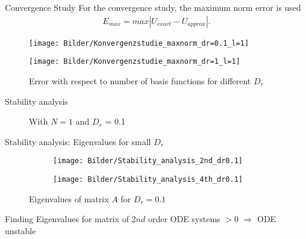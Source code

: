 \begin{frame}{Convergence Study}
	For the convergence study, the maximum norm error is used
	\begin{align*}
		E_{max} = max|U_{exact} - U_{approx}|.
	\end{align*}
	
	\begin{figure}
		\begin{minipage}{0.45\textwidth}
			\texttt{[image: Bilder/Konvergenzstudie\_maxnorm\_dr=0.1\_l=1]}
		\end{minipage}
		\hfill 
		\begin{minipage}{0.45\textwidth}
			\texttt{[image: Bilder/Konvergenzstudie\_maxnorm\_dr=1\_l=1]}
		\end{minipage}
		\caption{Error with respect to number of basis functions for different $D_r$}
	\end{figure}
\end{frame}


\begin{frame}{Stability analysis}
	\begin{figure}
		\centering
		\qquad
		\caption{With $N=1$ and $D_r$ = 0.1}
	\end{figure}
\end{frame}

\begin{frame}{Stability analysis: Eigenvalues for small $D_r$}
	\begin{figure}
		\begin{subfigure}{0.48\textwidth}
			\texttt{[image: Bilder/Stability\_analysis\_2nd\_dr0.1]}
		\end{subfigure}
		\hfill
		\begin{subfigure}{0.48\textwidth}
			\texttt{[image: Bilder/Stability\_analysis\_4th\_dr0.1]}
		\end{subfigure}
		\caption{Eigenvalues of matrix $A$ for $D_r = 0.1$}
	\end{figure}

	\begin{block}{Finding}
		Eigenvalues for matrix of $2nd$ order ODE systems $>0$ $\Rightarrow$ ODE unstable
	\end{block}
\end{frame}

